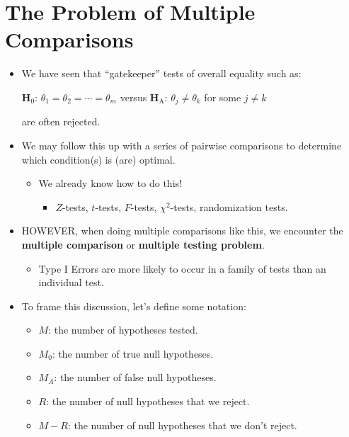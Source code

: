 \section{The Problem of Multiple Comparisons}
\begin{itemize}
      \item We have seen that ``gatekeeper'' tests of overall equality such as:
            \begin{tightcenter}
                  $ \mathbf{H}_0 $: $ \theta_1=\theta_2=\cdots=\theta_m $ versus $ \mathbf{H}_\text{A} $: $ \theta_j\ne \theta_k $ for some $ j\ne k $
            \end{tightcenter}
            are often rejected.
      \item We may follow this up with a series of pairwise comparisons to determine which condition(s) is (are)
            optimal.
            \begin{itemize}
                  \item We already know how to do this!
                        \begin{itemize}
                              \item $ Z $-tests, $ t $-tests, $ F $-tests, $ \chi^2 $-tests, randomization tests.
                        \end{itemize}
            \end{itemize}
      \item HOWEVER, when doing multiple comparisons like this, we encounter the \textbf{multiple comparison} or
            \textbf{multiple testing problem}.
            \begin{itemize}
                  \item Type I Errors are more likely to occur in a family of tests than an individual test.
            \end{itemize}
      \item To frame this discussion, let's define some notation:
            \begin{itemize}
                  \item $ M $: the number of hypotheses tested.
                  \item $ M_0 $: the number of true null hypotheses.
                  \item $ M_A $: the number of false null hypotheses.
                  \item $ R $: the number of null hypotheses that we reject.
                  \item $ M-R $: the number of null hypotheses that we don't reject.

\end{itemize}
\end{itemize}
